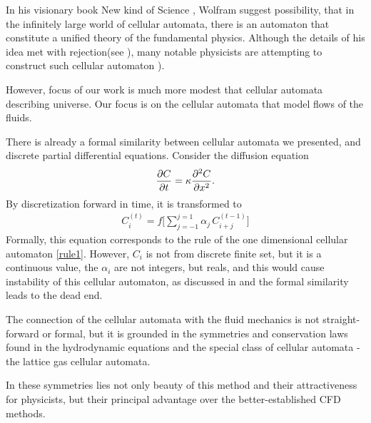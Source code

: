 

In his visionary book New kind of Science \cite{wolf}, Wolfram suggest possibility, that in the infinitely large world of cellular automata, there is an automaton that constitute a unified theory of the fundamental physics.
Although the details of his idea met with rejection(see \cite{aaronson}),
many notable physicists are attempting to construct such cellular automaton \cite{hooft}).
%

However, focus of our work is much more modest that cellular automata describing universe.
Our focus is on the cellular automata that model flows of the fluids.

There is already a formal similarity between cellular automata we presented, and discrete partial differential equations. Consider the diffusion equation
\begin{align*}
\frac{\partial C}{\partial t} = \kappa \frac{\partial^2 C}{\partial x^2}.
\end{align*}
By discretization forward in time, it is transformed to
\begin{align*}
C_i^{(t)} = f\big[\sum_{j=-1}^{j=1}\alpha_j \, C_{i+j}^{(t-1)} \big]
\end{align*}
Formally, this equation corresponds to the rule of the one dimensional cellular automaton \ref{rule1}. However, $C_i$ is not from discrete finite set, but it is a continuous value, the $\alpha_i$ are not integers, but reals, and this would cause instability of this cellular automaton, as discussed in \cite{wolf} and the formal similarity leads to the dead end.

The connection of the cellular automata with the fluid mechanics is not straight-forward or formal, but it is grounded in the symmetries and conservation laws found in the hydrodynamic equations and the special class of cellular automata - the lattice gas cellular automata.

In these symmetries lies not only beauty of this method and their attractiveness for physicists, but their principal advantage over the better-established CFD methods.
